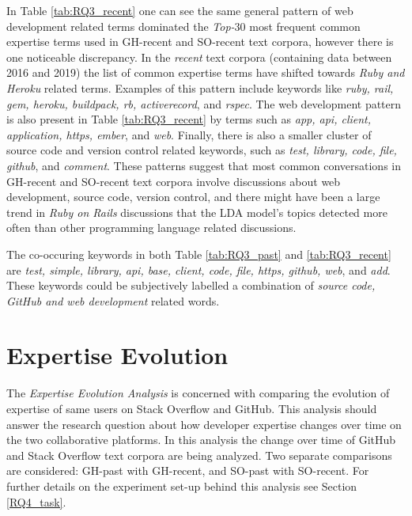         In Table \ref{tab:RQ3_recent} one can see the same general pattern of web development related terms dominated the \emph{Top-$30$} most frequent common expertise terms used in GH-recent and SO-recent text corpora, however there is one noticeable discrepancy. In the \emph{recent} text corpora (containing data between 2016 and 2019) the list of common expertise terms have shifted towards \emph{Ruby and Heroku} related terms. Examples of this pattern include keywords like \emph{ruby, rail, gem, heroku, buildpack, rb, activerecord}, and \emph{rspec}. The web development pattern is also present in Table \ref{tab:RQ3_recent} by terms such as \emph{app, api, client, application, https, ember}, and \emph{web}. Finally, there is also a smaller cluster of source code and version control related keywords, such as \emph{test, library, code, file, github}, and \emph{comment}. These patterns suggest that most common conversations in GH-recent and SO-recent text corpora involve discussions about web development, source code, version control, and there might have been a large trend in \emph{Ruby on Rails} discussions that the LDA model's topics detected more often than other programming language related discussions. 
        
        The co-occuring keywords in both Table \ref{tab:RQ3_past} and \ref{tab:RQ3_recent} are \emph{test, simple, library, api, base, client, code, file, https, github, web}, and \emph{add}. These keywords could be subjectively labelled a combination of \emph{source code, GitHub and web development} related words. \\
        
    
    \section{Expertise Evolution\label{sec:results_rq4}}
        
        The \emph{Expertise Evolution Analysis} is concerned with comparing the evolution of expertise of same users on Stack Overflow and GitHub. This analysis should answer the research question about how developer expertise changes over time on the two collaborative platforms. In this analysis the change over time of GitHub and Stack Overflow text corpora are being analyzed. Two separate comparisons are considered: GH-past with GH-recent, and SO-past with SO-recent. For further details on the experiment set-up behind this analysis see Section \ref{RQ4_task}.
        
